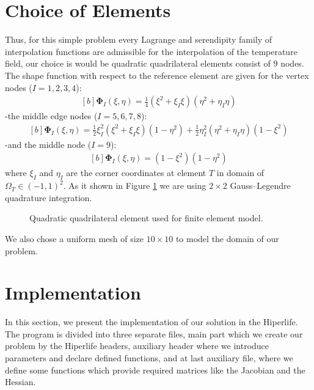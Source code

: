 \documentclass[]{article}
\begin{document}
\section{Choice of Elements} \label{sec: coe}
Thus, for this simple problem every Lagrange and serendipity family of interpolation functions are admissible for the interpolation of the temperature field, our choice is would be quadratic quadrilateral elements consist of $9$ nodes. The shape function with respect to the reference element are given for the vertex nodes ($I = 1, 2, 3, 4$):
\begin{equation}\label{eq18}
	\begin{aligned}[b]
		\boldsymbol{\Phi}_{I}(\xi, \eta) = \frac{1}{4}(\xi^2+\xi_I\xi)(\eta^2+\eta_I\eta)
	\end{aligned}
\end{equation}
-the middle edge nodes ($I = 5, 6, 7, 8$):
\begin{equation}\label{eq19}
	\begin{aligned}[b]
		\boldsymbol{\Phi}_{I}(\xi, \eta) = \frac{1}{2}\xi_I^2(\xi^2+\xi_I\xi)(1-\eta^2) + \frac{1}{2}\eta_I^2(\eta^2+\eta_I\eta)(1-\xi^2)
	\end{aligned}
\end{equation}
-and the middle node ($I = 9$):
\begin{equation}\label{eq20}
	\begin{aligned}[b]
		\boldsymbol{\Phi}_{I}(\xi, \eta) = (1-\xi^2)(1-\eta^2)
	\end{aligned}
\end{equation}
where $\xi_{I}$ and $\eta_{I}$ are the corner coordinates at element $T$ in domain of $\Omega_{T} \in (-1,1)^2$. As it shown in Figure \ref{fig_el} we are using $2 \times 2$ Gauss–Legendre quadrature integration.
\begin{figure}[htbp]
	\centering
	
	\caption{Quadratic quadrilateral element used for finite element model.}
	\label{fig_el}
\end{figure}
We also chose a uniform mesh of size $10 \times 10$ to model the domain of our problem.
\section{Implementation} \label{sec: imp}
In this section, we present the implementation of our solution in the Hiperlife. The program is divided into three separate files, main part which we create our problem by the Hiperlife headers, auxiliary header where we introduce parameters and declare defined functions, and at last auxiliary file, where we define some functions which provide required matrices like the Jacobian and the Hessian.
\end{document}
